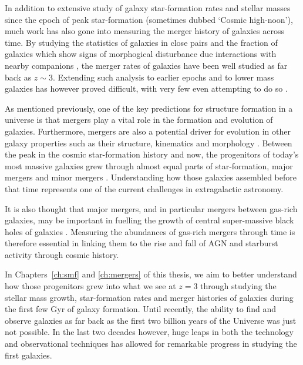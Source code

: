 In addition to extensive study of galaxy star-formation rates and stellar masses since the epoch of peak star-formation (sometimes dubbed `Cosmic high-noon'), much work has also gone into measuring the merger history of galaxies across time. By studying the statistics of galaxies in close pairs \citep{Patton:2000kt,LeFevre:2000iq,Bell:2006ey,Bluck:2009in,Bluck:2012dh} and the fraction of galaxies which show signs of morphogical disturbance due interactions with nearby companions \citep{Conselice:2003jz,Conselice:2008de,Lotz:2011bu}, the merger rates of galaxies have been well studied as far back as $z\sim3$. Extending such analysis to earlier epochs and to lower mass galaxies has however proved difficult, with very few even attempting to do so \citep{2009MNRAS.397..208C}.

As mentioned previously, one of the key predictions for structure formation in a \cdm{} universe is that mergers play a vital role in the formation and evolution of galaxies. Furthermore, mergers are also a potential driver for evolution in other galaxy properties such as their structure, kinematics and morphology \citep{Conselice:2014ct}. Between the peak in the cosmic star-formation history and now, the progenitors of today's most massive galaxies grew through almost equal parts of star-formation, major mergers and minor mergers \citep{Ownsworth:2014gt}. Understanding how those galaxies assembled before that time represents one of the current challenges in extragalactic astronomy.

It is also thought that major mergers, and in particular mergers between gas-rich galaxies, may be important in fuelling the growth of central super-massive black holes of galaxies \citep{Springel:2005co,Hopkins:2008ip,Hopkins:2008gr}. Measuring the abundances of gas-rich mergers through time is therefore essential in linking them to the rise and fall of AGN and starburst activity through cosmic history.

In Chapters~\ref{ch:smf} and \ref{ch:mergers} of this thesis, we aim to better understand how those progenitors grew into what we see at $z=3$ through studying the stellar mass growth, star-formation rates and merger histories of galaxies during the first few Gyr of galaxy formation. Until recently, the ability to find and observe galaxies as far back as the first two billion years of the Universe was just not possible. In the last two decades however, huge leaps in both the technology and observational techniques has allowed for remarkable progress in studying the first galaxies.

